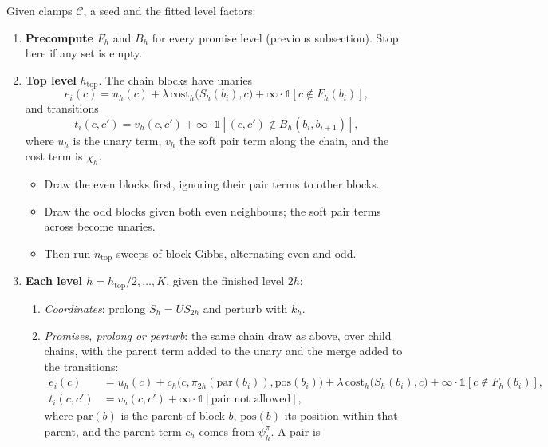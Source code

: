 \documentclass[11pt]{article}
\newcommand{\1}{\mathds{1}}
\begin{document}
Given clamps $\mathcal C$, a seed and the fitted level factors:
\begin{enumerate}
  \item \textbf{Precompute} $F_h$ and $B_h$ for every promise level (previous subsection).
        Stop here if any set is empty.
  \item \textbf{Top level} $h_{\text{top}}$. The chain blocks have unaries
        \[
          e_i(c) = u_{h}(c) + \lambda\,\mathrm{cost}_h\big(S_h(b_i), c\big)
                   + \infty \cdot \1[c \notin F_h(b_i)],
        \]
        and transitions
        \[
          t_i(c, c') = v_h(c, c') + \infty \cdot \1[(c, c') \notin B_h(b_i, b_{i+1})],
        \]
        where $u_h$ is the unary term, $v_h$ the soft pair term along the chain, and the cost term
        is $\chi_h$.
        \begin{itemize}
          \item Draw the even blocks first, ignoring their pair terms to other blocks.
          \item Draw the odd blocks given both even neighbours; the soft pair terms across become
                unaries.
          \item Then run $n_{\text{top}}$ sweeps of block Gibbs, alternating even and odd.
        \end{itemize}
  \item \textbf{Each level $h = h_{\text{top}}/2, \dots, K$}, given the finished level $2h$:
        \begin{enumerate}
          \item \emph{Coordinates}: prolong $S_h = U S_{2h}$ and perturb with $k_h$.
          \item \emph{Promises, prolong or perturb}: the same chain draw as above, over child
                chains, with the parent term added to the unary and the merge added to the
                transitions:
                \begin{align*}
                  e_i(c) &= u_h(c) + c_h\big(c, \pi_{2h}(\mathrm{par}(b_i)), \mathrm{pos}(b_i)\big)
                           + \lambda\,\mathrm{cost}_h\big(S_h(b_i), c\big)
                           + \infty \cdot \1[c \notin F_h(b_i)], \\
                  t_i(c, c') &= v_h(c, c') + \infty \cdot \1[\text{pair not allowed}],
                \end{align*}
                where $\mathrm{par}(b)$ is the parent of block $b$, $\mathrm{pos}(b)$ its position
                within that parent, and the parent term $c_h$ comes from $\psi^\pi_h$. A pair is

\end{enumerate}
\end{enumerate}
\end{document}
